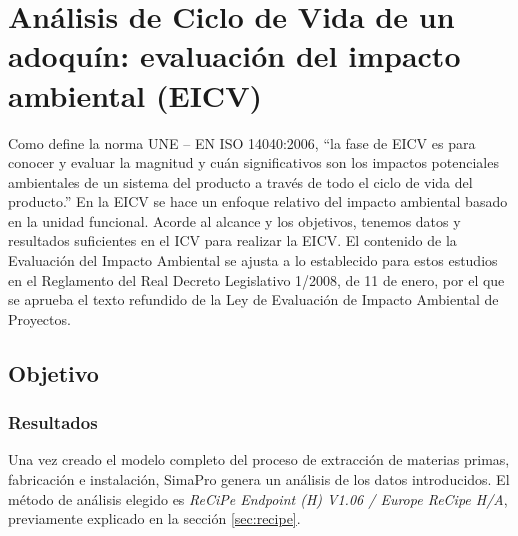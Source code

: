\chapter{Análisis de Ciclo de Vida de un adoquín: evaluación del impacto ambiental (EICV)}
Como define la norma UNE – EN ISO 14040:2006, “la fase de EICV es para conocer y evaluar la magnitud y cuán significativos son los impactos potenciales ambientales de un sistema del producto a través de todo el ciclo de vida del producto.”
En la EICV se hace un enfoque relativo del impacto ambiental basado en la unidad funcional. Acorde al alcance y los objetivos, tenemos datos y resultados suficientes en el ICV para realizar la EICV.
El contenido de la Evaluación del Impacto Ambiental se ajusta a lo establecido para estos estudios en el Reglamento del Real Decreto Legislativo 1/2008, de 11 de enero, por el que se aprueba el texto refundido de la Ley de Evaluación de Impacto Ambiental de Proyectos.

\section{Objetivo}
\subsection{Resultados}

Una vez creado el modelo completo del proceso de extracción de materias primas, fabricación e instalación, SimaPro genera un análisis de los datos introducidos. El método de análisis elegido es \textit{ReCiPe Endpoint (H) V1.06 / Europe ReCipe H/A}, previamente explicado en la sección \ref{sec:recipe}.

